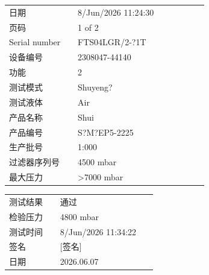 \documentclass[UTF8,10pt,a4paper,fontset=fandol]{ctexart}
\newcommand{\fieldvalue}[1]{#1}
\newcommand{\handwritten}[1]{#1}
\begin{document}
\begin{tabular}{@{}p{0.30\linewidth}p{0.58\linewidth}@{}}
日期 &
\fieldvalue{8/Jun/2026 11:24:30}
\\
页码 &
\fieldvalue{1 of 2}
\\
Serial number &
\fieldvalue{FTS04LGR/2-?1T}
\\
设备编号 &
\fieldvalue{2308047-44140}
\\
功能 &
\fieldvalue{2}
\\
测试模式 &
\fieldvalue{Shuyeng?}
\\
测试液体 &
\fieldvalue{Air}
\\
产品名称 &
\fieldvalue{Shui}
\\
产品编号 &
\fieldvalue{S?M?EP5-2225}
\\
生产批号 &
\fieldvalue{1:000}
\\
过滤器序列号 &
\fieldvalue{4500 mbar}
\\
最大压力 &
\fieldvalue{>7000 mbar}
\end{tabular}

\vspace{1em}

\begin{tabular}{@{}p{0.30\linewidth}p{0.58\linewidth}@{}}
测试结果 &
\fieldvalue{通过}
\\
检验压力 &
\fieldvalue{4800 mbar}
\\
测试时间 &
\fieldvalue{8/Jun/2026 11:34:22}
\\
签名 &
\fieldvalue{\handwritten{[签名]}}
\\
日期 &
\fieldvalue{\handwritten{2026.06.07}}
\end{tabular}
\end{document}
